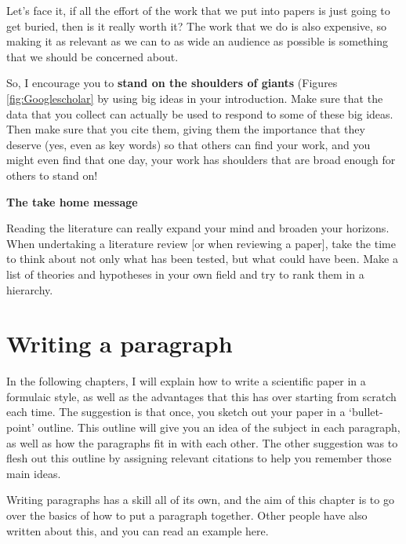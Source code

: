 \documentclass[
]{krantz}
\begin{document}
Let's face it, if all the effort of the work that we put into papers is just going to get buried, then is it really worth it? The work that we do is also expensive, so making it as relevant as we can to as wide an audience as possible is something that we should be concerned about.

So, I encourage you to \textbf{stand on the shoulders of giants} (Figures \ref{fig:Googlescholar} by using big ideas in your introduction. Make sure that the data that you collect can actually be used to respond to some of these big ideas. Then make sure that you cite them, giving them the importance that they deserve (yes, even as key words) so that others can find your work, and you might even find that one day, your work has shoulders that are broad enough for others to stand on!

\textbf{The take home message}

Reading the literature can really expand your mind and broaden your horizons. When undertaking a literature review {[}or when reviewing a paper{]}, take the time to think about not only what has been tested, but what could have been. Make a list of theories and hypotheses in your own field and try to rank them in a hierarchy.

\hypertarget{paragraph}{%
\section{Writing a paragraph}\label{paragraph}}

In the following chapters, I will explain how to write a scientific paper in a formulaic style, as well as the advantages that this has over starting from scratch each time. The suggestion is that once, you sketch out your paper in a `bullet-point' outline. This outline will give you an idea of the subject in each paragraph, as well as how the paragraphs fit in with each other. The other suggestion was to flesh out this outline by assigning relevant citations to help you remember those main ideas.

Writing paragraphs has a skill all of its own, and the aim of this chapter is to go over the basics of how to put a paragraph together. Other people have also written about this, and you can read an example here.
\end{document}
